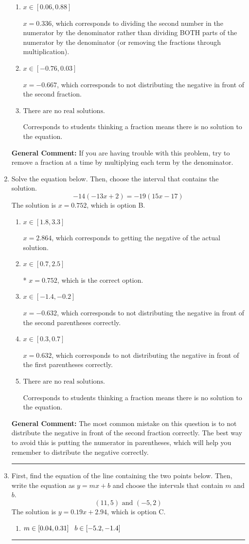 \documentclass{extbook}[14pt]
\newcommand{\litem}[1]{\item #1

\rule{\textwidth}{0.4pt}}
\begin{document}
\begin{enumerate}
{\begin{enumerate}[label=\Alph*.]
* $x = 1.843$, which is the correct option.
\item \( x \in [0.06, 0.88] \)

 $x = 0.336$, which corresponds to dividing the second number in the numerator by the denominator rather than dividing BOTH parts of the numerator by the denominator (or removing the fractions through multiplication).
\item \( x \in [-0.76, 0.03] \)

 $x = -0.667$, which corresponds to not distributing the negative in front of the second fraction.
\item \( \text{There are no real solutions.} \)

Corresponds to students thinking a fraction means there is no solution to the equation.
\end{enumerate}

\textbf{General Comment:} If you are having trouble with this problem, try to remove a fraction at a time by multiplying each term by the denominator.
}
\litem{
Solve the equation below. Then, choose the interval that contains the solution.
\[ -14(-13x + 2) = -19(15x -17) \]The solution is \( x = 0.752 \), which is option B.\begin{enumerate}[label=\Alph*.]
\item \( x \in [1.8, 3.3] \)

$x = 2.864$, which corresponds to getting the negative of the actual solution.
\item \( x \in [0.7, 2.5] \)

* $x = 0.752$, which is the correct option.
\item \( x \in [-1.4, -0.2] \)

$x = -0.632$, which corresponds to not distributing the negative in front of the second parentheses correctly.
\item \( x \in [0.3, 0.7] \)

$x = 0.632$, which corresponds to not distributing the negative in front of the first parentheses correctly.
\item \( \text{There are no real solutions.} \)

Corresponds to students thinking a fraction means there is no solution to the equation.
\end{enumerate}

\textbf{General Comment:} The most common mistake on this question is to not distribute the negative in front of the second fraction correctly. The best way to avoid this is putting the numerator in parentheses, which will help you remember to distribute the negative correctly.
}
\litem{
First, find the equation of the line containing the two points below. Then, write the equation as $ y=mx+b $ and choose the intervals that contain $m$ and $b$.
\[ (11, 5) \text{ and } (-5, 2) \]The solution is \( y = 0.19x + 2.94 \), which is option C.\begin{enumerate}[label=\Alph*.]
\item \( m \in [0.04, 0.31] \hspace*{3mm} b \in [-5.2, -1.4] \)


\end{enumerate}}
\end{enumerate}
\end{document}
